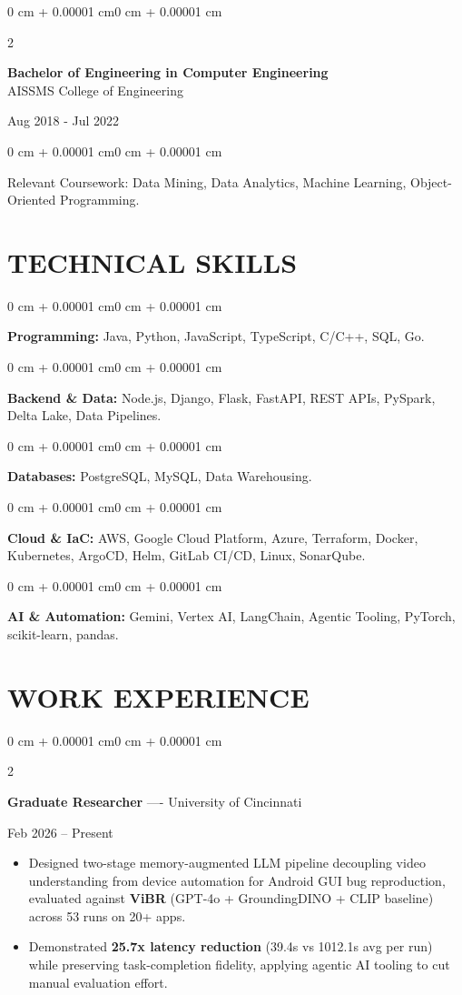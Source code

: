 \documentclass[10pt, letterpaper]{article}
\newenvironment{highlights}{
    \begin{itemize}[
        topsep=0.10 cm,
        parsep=0.06 cm,
        partopsep=0pt,
        itemsep=0.06 cm,
        leftmargin=12pt
    ]
}{
    \end{itemize}
}
\newenvironment{onecolentry}{
    \begin{adjustwidth}{0 cm + 0.00001 cm}{0 cm + 0.00001 cm}
}{
    \end{adjustwidth}
}
\newenvironment{twocolentry}[2][]{
    \onecolentry
    \def\secondColumn{#2}
    \setcolumnwidth{\fill, 4.5 cm}
    \begin{paracol}{2}
}{
    \switchcolumn \raggedleft \secondColumn
    \end{paracol}
    \endonecolentry
}
\begin{document}
\begin{twocolentry}{
    Aug 2018 - Jul 2022
}
    \textbf{Bachelor of Engineering in Computer Engineering} \\
    AISSMS College of Engineering
\end{twocolentry}
\begin{onecolentry}
Relevant Coursework: Data Mining, Data Analytics, Machine Learning, Object-Oriented Programming.
\end{onecolentry}
\section{TECHNICAL SKILLS}
\begin{onecolentry}
\textbf{Programming:} Java, Python, JavaScript, TypeScript, C/C++, SQL, Go.
\end{onecolentry}
\vspace{0.06 cm}
\begin{onecolentry}
\textbf{Backend \& Data:} Node.js, Django, Flask, FastAPI, REST APIs, PySpark, Delta Lake, Data Pipelines.
\end{onecolentry}
\vspace{0.06 cm}
\begin{onecolentry}
\textbf{Databases:} PostgreSQL, MySQL, Data Warehousing.
\end{onecolentry}
\vspace{0.06 cm}
\begin{onecolentry}
\textbf{Cloud \& IaC:} AWS, Google Cloud Platform, Azure, Terraform, Docker, Kubernetes, ArgoCD, Helm, GitLab CI/CD, Linux, SonarQube.
\end{onecolentry}
\vspace{0.06 cm}
\begin{onecolentry}
\textbf{AI \& Automation:} Gemini, Vertex AI, LangChain, Agentic Tooling, PyTorch, scikit-learn, pandas.
\end{onecolentry}

\section{WORK EXPERIENCE}
\begin{twocolentry}{Feb 2026 -- Present}
\textbf{Graduate Researcher} ---- University of Cincinnati
\end{twocolentry}
\begin{highlights}
  \item Designed two-stage memory-augmented LLM pipeline decoupling video understanding from device automation for Android GUI bug reproduction, evaluated against \textbf{ViBR} (GPT-4o + GroundingDINO + CLIP baseline) across 53 runs on 20+ apps.
  \item Demonstrated \textbf{25.7x latency reduction} (39.4s vs 1012.1s avg per run) while preserving task-completion fidelity, applying agentic AI tooling to cut manual evaluation effort.
\end{highlights}
\end{document}
